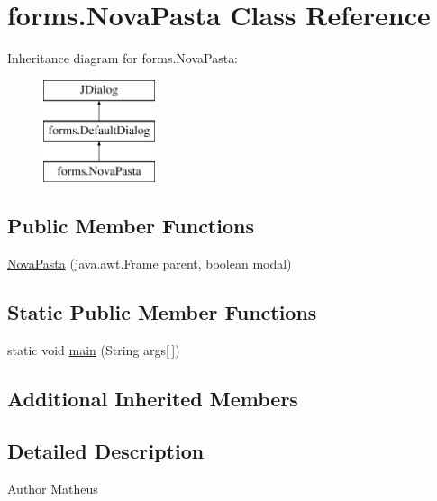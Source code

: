 \hypertarget{classforms_1_1_nova_pasta}{\section{forms.\+Nova\+Pasta Class Reference}
\label{classforms_1_1_nova_pasta}
}
Inheritance diagram for forms.\+Nova\+Pasta\+:\begin{figure}[H]
\begin{center}
\leavevmode
\includegraphics[height=3.000000cm]{classforms_1_1_nova_pasta}
\end{center}
\end{figure}
\subsection*{Public Member Functions}
\begin{DoxyCompactItemize}
\item 
\hyperlink{classforms_1_1_nova_pasta_a5d37e732079eb24bdb8a3c5ee30a8484}{Nova\+Pasta} (java.\+awt.\+Frame parent, boolean modal)
\end{DoxyCompactItemize}
\subsection*{Static Public Member Functions}
\begin{DoxyCompactItemize}
\item 
static void \hyperlink{classforms_1_1_nova_pasta_a1f36e0af1fca5787a4bfb508be6e60ee}{main} (String args\mbox{[}$\,$\mbox{]})
\end{DoxyCompactItemize}
\subsection*{Additional Inherited Members}


\subsection{Detailed Description}
\begin{DoxyAuthor}{Author}
Matheus 
\end{DoxyAuthor}


